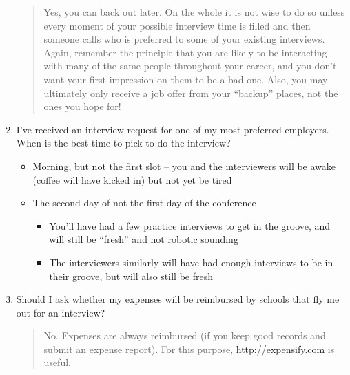 \documentclass{\classes/econtex}
\providecommand\phantomsection{}
\begin{document}
\begin{enumerate}
  \begin{quote}
    Yes, you can back out later.  On the whole it is not wise to do so unless every moment of your possible interview time is filled and then someone calls who is preferred to some of your existing interviews.  Again, remember the principle that you are likely to be interacting with many of the same people throughout your career, and you don't want your first impression on them to be a bad one.  Also, you may ultimately only receive a job offer from your ``backup'' places, not the ones you hope for!

  \end{quote}
  \ifdvi\phantomsection\hypertarget{InterviewBestTime}{}\fi
  
\item  I've received an interview request for one of my most preferred employers. When is the best time to pick to do the interview?
  \begin{itemize}
  \item Morning, but not the first slot -- you and the interviewers will be awake (coffee will have kicked in) but not yet be tired
  \item The second day of not the first day of the conference
    \begin{itemize}
    \item You'll have had a few practice interviews to get in the groove, and will still be ``fresh'' and not robotic sounding
    \item The interviewers similarly will have had enough interviews to be in their groove, but will also still be fresh
    \end{itemize}
  \end{itemize}

\item  Should I ask whether my expenses will be reimbursed by schools that fly me out for an interview?
  \begin{quote}
    No.  Expenses are always reimbursed (if you keep good records and submit an expense report).  For this purpose, \url{http://expensify.com} is useful.

  \end{quote}


\end{enumerate}
\end{document}

